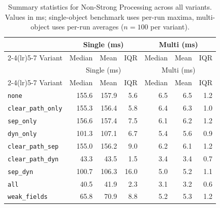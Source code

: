 \begin{longtable}[c]{l rrr rrr}
\caption[Non-Strong Processing summary statistics]{Summary statistics for Non-Strong Processing across all variants. Values in ms; single-object benchmark uses per-run maxima, multi-object uses per-run averages ($n=100$ per variant).}\label{tab:stats-nonstrong} \\
\toprule
 & \multicolumn{3}{c}{Single (ms)} & \multicolumn{3}{c}{Multi (ms)} \\
\cmidrule(lr){2-4}\cmidrule(lr){5-7}
Variant & Median & Mean & IQR & Median & Mean & IQR \\
\midrule
\endfirsthead
\toprule
 & \multicolumn{3}{c}{Single (ms)} & \multicolumn{3}{c}{Multi (ms)} \\
\cmidrule(lr){2-4}\cmidrule(lr){5-7}
Variant & Median & Mean & IQR & Median & Mean & IQR \\
\midrule
\endhead
\bottomrule
\endfoot
\texttt{none} & 155.6 & 157.9 & 5.6 & 6.5 & 6.5 & 1.2 \\
\texttt{clear\_path\_only} & 155.3 & 156.4 & 5.8 & 6.4 & 6.3 & 1.0 \\
\texttt{sep\_only} & 156.6 & 157.4 & 7.5 & 6.1 & 6.2 & 1.2 \\
\texttt{dyn\_only} & 101.3 & 107.1 & 6.7 & 5.4 & 5.6 & 0.9 \\
\texttt{clear\_path\_sep} & 155.0 & 156.2 & 9.0 & 6.2 & 6.1 & 1.2 \\
\texttt{clear\_path\_dyn} & 43.3 & 43.5 & 1.5 & 3.4 & 3.4 & 0.7 \\
\texttt{sep\_dyn} & 100.7 & 106.3 & 16.0 & 5.0 & 5.2 & 1.1 \\
\texttt{all} & 40.5 & 41.9 & 2.3 & 3.1 & 3.2 & 0.6 \\
\texttt{weak\_fields} & 65.8 & 70.9 & 8.8 & 5.2 & 5.3 & 1.2 \\
\end{longtable}
